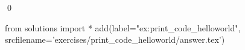 
\begin{ex} 
  \label{ex:print_code_helloworld}
  
  \qed
\end{ex} 
\begin{python0}
from solutions import *
add(label="ex:print_code_helloworld",
    srcfilename='exercises/print_code_helloworld/answer.tex') 
\end{python0}
